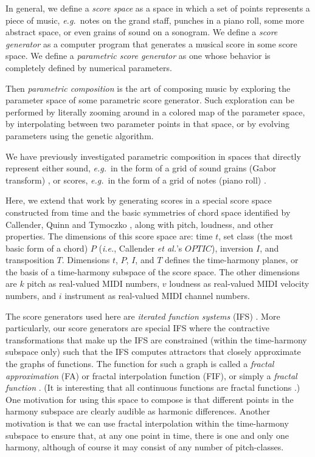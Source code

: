\documentclass[english,11pt,letterpaper,onecolumn]{scrartcl}
\numberwithin{equation}{section}
\begin{document}
In general, we define a \textit{score space} as a space in which a set of points
represents a piece of music, \textit{e.g.}\ notes on the grand staff, punches in
a piano roll, some more abstract space, or even grains of sound on a sonogram.
We define a \textit{score generator} as a computer program that generates a
musical score in some score space. We define a \textit{parametric score
generator} as one whose behavior is completely defined by numerical parameters.

Then \textit{parametric composition} is the art of composing music by exploring
the parameter space of some parametric score generator. Such exploration can be
performed by literally zooming around in a colored map of the parameter space,
by interpolating between two parameter points in that space, or by evolving
parameters using the genetic algorithm.

We have previously investigated parametric composition in spaces that directly
represent either sound, \textit{e.g.}\ in the form of a grid of sound grains
(Gabor transform) \cite{obsessed}, or scores, \textit{e.g.}\ in the form of a
grid of notes (piano roll) \cite{ifsmusic}.

Here, we extend that work by generating scores in a special score space
constructed from time and the basic symmetries of chord space identified by
Callender, Quinn and Tymoczko \cite{callender:346}, along with pitch, loudness,
and other properties. The dimensions of this score space are: time $t$, set
class (the most basic form of a chord) $P$ (\textit{i.e.}, Callender \textit{et
al.}'s $OPTIC$), inversion $I$, and transposition $T$. Dimensions $t$, $P$, $I$,
and $T$ defines the time-harmony planes, or the basis of a time-harmony subspace
of the score space. The other dimensions are $k$ pitch as real-valued MIDI
numbers, $v$ loudness as real-valued MIDI velocity numbers, and $i$ instrument
as real-valued MIDI channel numbers.

The score generators used here are \textit{iterated function systems} (IFS)
\cite{barnsley1985iterated, 10.2307/24893080, fractalseverywhere}. More
particularly, our score generators are special IFS where the contractive
transformations that make up the IFS are constrained (within the time-harmony
subspace only) such that the IFS computes attractors that closely approximate
the graphs of functions. The function for such a graph is called a
\textit{fractal approximation} (FA) or fractal interpolation function (FIF), or
simply a \textit{fractal function} \cite{Barnsley1986, fractalseverywhere,
navascues2014fractal}. (It is interesting that all continuous functions are
fractal functions \cite{2016arXiv161001369B}.) One motivation for using this
space to compose is that different points in the harmony subspace are clearly
audible as harmonic differences. Another motivation is that we can use fractal
interpolation within the time-harmony subspace to ensure that, at any one point
in time, there is one and only one harmony, although of course it may consist of
any number of pitch-classes.
\end{document}
